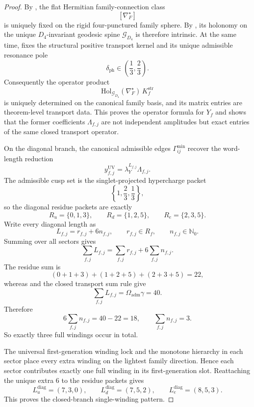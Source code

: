 \documentclass[11pt,a4paper]{article}
\theoremstyle{definition}
\theoremstyle{remark}
\newcommand{\Oadm}{\Omega_{\mathrm{adm}}}
\newcommand{\lambdaY}{\lambda_Y}
\begin{document}
\begin{proof}
By , the flat Hermitian family-connection class
\[
[\nabla_F^\star]
\]
is uniquely fixed on the rigid four-punctured family sphere. By
, its holonomy on the unique
$D_4$-invariant geodesic spine $\mathcal G_{D_4}$ is therefore intrinsic. At the same time,
 fixes the structural positive
transport kernel and its unique admissible resonance pole
\[
\delta_{\mathrm{ph}}\in\left(\frac13,\frac23\right).
\]
Consequently the operator product
\[
\mathrm{Hol}_{\mathcal G_{D_4}}(\nabla_F^\star)\,K_f^{\mathrm{str}}
\]
is uniquely determined on the canonical family basis, and its matrix entries are theorem-level
transport data. This proves the operator formula for $Y_f$ and shows that the former coefficients
$\Lambda_{f,j}$ are not independent amplitudes but exact entries of the same closed transport
operator.

On the diagonal branch, the canonical admissible edges $\Gamma_{ij}^{\min}$ recover the word-length
reduction
\[
y_{f,j}^{\mathrm{UV}}=\lambdaY^{L_{f,j}}\Lambda_{f,j}.
\]
The admissible cusp set is the singlet-projected hypercharge packet
\[
\left\{1,\frac23,\frac13\right\},
\]
so the diagonal residue packets are exactly
\[
R_u=\{0,1,3\},
\qquad
R_d=\{1,2,5\},
\qquad
R_e=\{2,3,5\}.
\]
Write every diagonal length as
\[
L_{f,j}=r_{f,j}+6n_{f,j},
\qquad
r_{f,j}\in R_f,
\qquad
n_{f,j}\in\mathbb N_0.
\]
Summing over all sectors gives
\[
\sum_{f,j}L_{f,j}
=
\sum_{f,j}r_{f,j}+6\sum_{f,j}n_{f,j}.
\]
The residue sum is
\[
(0+1+3)+(1+2+5)+(2+3+5)=22,
\]
whereas  and the closed transport sum rule give
\[
\sum_{f,j}L_{f,j}=\Oadm\gamma=40.
\]
Therefore
\[
6\sum_{f,j}n_{f,j}=40-22=18,
\qquad
\sum_{f,j}n_{f,j}=3.
\]
So exactly three full windings occur in total.

The universal first-generation winding lock and the monotone hierarchy in each sector place every
extra winding on the lightest family direction. Hence each sector contributes exactly one full
winding in its first-generation slot. Reattaching the unique extra $6$ to the residue packets gives
\[
L_u^{\mathrm{diag}}=(7,3,0),\qquad
L_d^{\mathrm{diag}}=(7,5,2),\qquad
L_e^{\mathrm{diag}}=(8,5,3).
\]
This proves the closed-branch single-winding pattern.
\end{proof}
\end{document}
